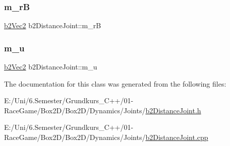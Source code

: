 \mbox{\label{classb2_distance_joint_a70eab22cb7abeb825744f5dc3befa63a}} 
\subsubsection{\texorpdfstring{m\_rB}{m\_rB}}
{\footnotesize\ttfamily \mbox{\hyperlink{structb2_vec2}{b2\+Vec2}} b2\+Distance\+Joint\+::m\+\_\+rB\hspace{0.3cm}{\ttfamily [protected]}}

\mbox{\label{classb2_distance_joint_a78f45f86d3cf68701a0871e9de71fcd0}} 
\subsubsection{\texorpdfstring{m\_u}{m\_u}}
{\footnotesize\ttfamily \mbox{\hyperlink{structb2_vec2}{b2\+Vec2}} b2\+Distance\+Joint\+::m\+\_\+u\hspace{0.3cm}{\ttfamily [protected]}}



The documentation for this class was generated from the following files\+:\begin{DoxyCompactItemize}
\item 
E\+:/\+Uni/6.\+Semester/\+Grundkurs\+\_\+\+C++/01-\/\+Race\+Game/\+Box2\+D/\+Box2\+D/\+Dynamics/\+Joints/\mbox{\hyperlink{b2_distance_joint_8h}{b2\+Distance\+Joint.\+h}}\item 
E\+:/\+Uni/6.\+Semester/\+Grundkurs\+\_\+\+C++/01-\/\+Race\+Game/\+Box2\+D/\+Box2\+D/\+Dynamics/\+Joints/\mbox{\hyperlink{b2_distance_joint_8cpp}{b2\+Distance\+Joint.\+cpp}}\end{DoxyCompactItemize}
